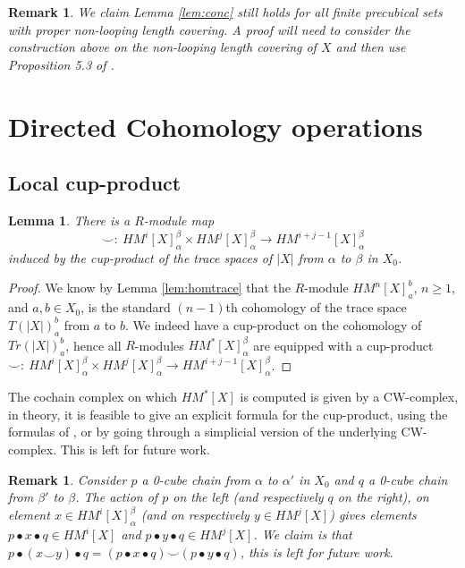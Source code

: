 \documentclass{article}
\newtheorem{lemma}[definition]{Lemma} %
\newtheorem{remark}[definition]{Remark} %
\begin{document}
\begin{remark}
We claim Lemma \ref{lem:conc} still holds for all finite precubical sets with proper non-looping length covering. A proof will need to consider the construction above on the non-looping length covering of $X$ and then use  Proposition 5.3 of \cite{RaussenII}. 
\end{remark}

\section{Directed Cohomology operations}

\label{sec:directedoperationscub}

\subsection{Local cup-product}

\begin{lemma}
There is a $R$-module map 
$$\smile: \ HM^i[X]_\alpha^\beta \times HM^j[X]_\alpha^\beta \rightarrow HM^{i+j-1}[X]_\alpha^\beta$$ induced by the cup-product of the trace spaces of $|X|$ from $\alpha$ to $\beta$ in $X_0$. 
\end{lemma}

\begin{proof}
We know by Lemma \ref{lem:homtrace} that 
the $R$-module $HM^n[X]^b_a$, $n \geq 1$, and $a, b \in X_0$, is the standard $(n-1)$th cohomology of the trace space $T(| X |)^b_a$ from $a$ to $b$. We indeed have a cup-product on the cohomology of $Tr(| X |)^b_a$, hence 
all $R$-modules $HM^*[X]_\alpha^\beta$ are equipped with a cup-product $\smile: \ HM^i[X]_\alpha^\beta \times HM^j[X]_\alpha^\beta \rightarrow HM^{i+j-1}[X]_\alpha^\beta$. 
\end{proof}

The cochain complex on which $HM^*[X]$ is computed is given by a CW-complex, in theory, it is feasible to give an explicit formula for the cup-product, using the formulas of \cite{Whitney}, or by going through a simplicial version of the underlying CW-complex. This is left for future work. 


\begin{remark}
Consider $p$ a 0-cube chain from $\alpha$ to $\alpha'$ in $X_0$ and $q$ a 0-cube chain from $\beta'$ to $\beta$. The action of $p$ on the left (and respectively $q$ on the right), on element $x\in HM^i[X]_\alpha^\beta$ (and on respectively $y\in HM^j[X]$) gives elements
$p\bullet x \bullet q \in HM^i[X]$ and $p\bullet y \bullet q \in HM^j[X]$. We claim is that $p\bullet (x \smile y) \bullet q=(p\bullet x\bullet q)\smile (p\bullet y\bullet q)$, this is left for future work. 
\end{remark}
\end{document}
